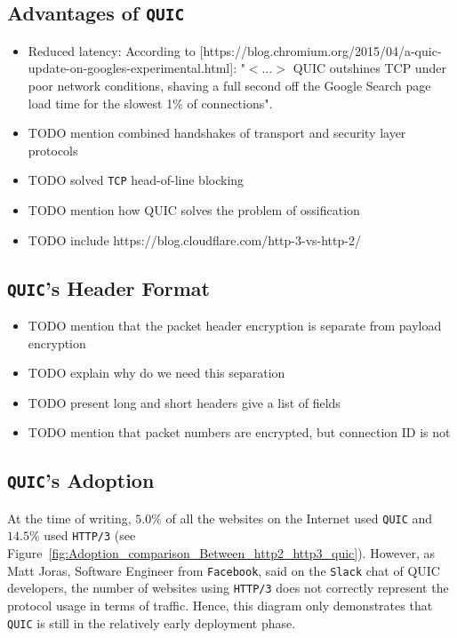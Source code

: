 \documentclass[12pt,a4paper,twoside,openright]{report}
\begin{document}
\subsection{Advantages of \texttt{QUIC}} \label{QUIC_advantages}

\begin{itemize}
  \item Reduced latency:
  According to [https://blog.chromium.org/2015/04/a-quic-update-on-googles-experimental.html]: "$<\ldots>$ QUIC outshines TCP under poor network conditions, shaving a full second off the Google Search page load time for the slowest 1\% of connections".
  \item TODO mention combined handshakes of transport and security layer protocols 

  \item TODO solved \texttt{TCP} head-of-line blocking

  
  \item TODO mention how QUIC solves the problem of ossification
  
  \item TODO include https://blog.cloudflare.com/http-3-vs-http-2/
\end{itemize}




\subsection{\texttt{QUIC}'s Header Format} \label{subsection_QUIC_header_format}

\begin{itemize}
  \item TODO mention that the packet header encryption is separate from payload encryption
  \item TODO explain why do we need this separation
  \item TODO present long and short headers give a list of fields
  \item TODO mention that packet numbers are encrypted, but connection ID is not
\end{itemize}

\subsection{\texttt{QUIC}'s Adoption}

At the time of writing, $5.0\%$ of all the websites on the Internet used \texttt{QUIC} and $14.5\%$ used \texttt{HTTP/3} \cite{bib_Adoption_comparison_Between_http2_http3_quic}
(see Figure~\ref{fig:Adoption_comparison_Between_http2_http3_quic}).
However, as Matt Joras, Software Engineer from \texttt{Facebook}, said on the \texttt{Slack} chat of QUIC developers, the number of websites using \texttt{HTTP/3} does not correctly represent the protocol usage in terms of traffic. 
Hence, this diagram only demonstrates that \texttt{QUIC} is still in the relatively early deployment phase.
\end{document}
